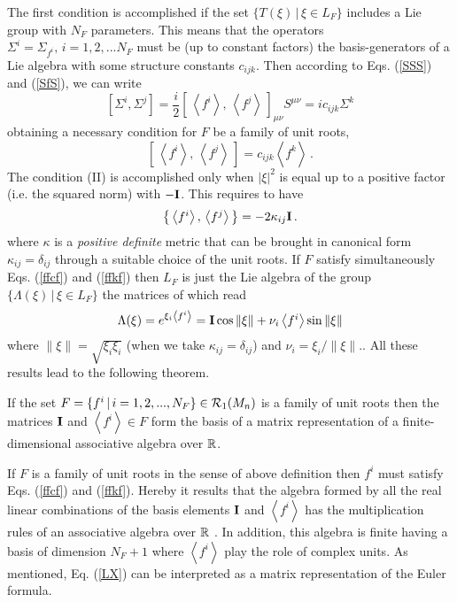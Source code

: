 \documentclass[a4paper,12pt]{article}
\begin{document}
The first condition is accomplished if the set $\{ T(\xi)\,|\, \xi \in L_F\}$ 
includes a Lie group with $N_F$ parameters. This means that the  operators 
$\Sigma^i=\Sigma_{f^i},\, i=1,2,...N_F $ must be (up to constant factors) the 
basis-generators of a Lie algebra with some structure constants $c_{ijk}$. 
Then according to Eqs. (\ref{SSS}) and (\ref{SfS}), we can write
\begin{equation}\label{SSffS}
\left[\Sigma^i, \Sigma^j\right]=
\textstyle{\frac{i}{2} \left[\,\left<f^i\right>,\,\left<f^j\right>\,
\right]_{\mu\nu}} S^{\mu\nu}= ic_{ijk}\Sigma^k 
\end{equation}
obtaining a necessary condition for $F$ be a family of unit roots,
\begin{equation}\label{ffcf}
{\textstyle [\,\left<f^i\right>,\,\left<f^j\right>\, ]}=c_{ijk}
{\textstyle \left< \right.} f^k {\textstyle \left. \right>}\,.
\end{equation} 
The condition (II) is accomplished only when $|\xi|^2$ is equal up to a 
positive factor (i.e. the squared norm) with $-{\bf I}$. This requires to have
\begin{equation}\label{ffkf}
 \left\{\,\textstyle{\left<f^i\right>,\,\left<f^j\right>}\,\right\}
=-2\kappa_{ij} {\bf I}\,.
\end{equation} 
where $\kappa$ is a {\em positive definite} metric that can be brought in 
canonical 
form $\kappa_{ij}=\delta_{ij}$ through a suitable choice of the 
unit roots.  
If $F$ satisfy simultaneously Eqs. (\ref{ffcf}) and (\ref{ffkf}) then $L_F$ is 
just the Lie algebra of the group $\{\Lambda(\xi)\,|\, \xi\in L_F\}$ the 
matrices of which read
\begin{equation}\label{LX}  
\Lambda(\xi)=\textstyle{e^{\xi_i \left<f^i\right>}={\bf I}\cos\|\xi\|+
\nu_i \left<f^i\right>}\sin\|\xi\|
\end{equation} 
where $\|\xi\|=\sqrt{\xi_i\xi_i}$ (when we take $\kappa_{ij}=\delta_{ij}$) and 
$\nu_i =\xi_i/\|\xi\|$.. All these results lead to the following theorem.
\begin{theor}
If the set $F=\{f^i\,|\,i=1,2,...,N_F\} \in {\cal R}_1(M_n)$ is a family of 
unit roots then the matrices ${\bf I}$ and $\left<f^i\right>\in F$ form the 
basis of a matrix representation of a finite-dimensional associative algebra 
over ${\Bbb R}$.      
\end{theor}
\begin{demo}
If $F$ is a family of unit roots in the sense of above definition then 
$f^i$ must satisfy Eqs. (\ref{ffcf}) and (\ref{ffkf}). Hereby it results that 
the algebra formed by all the real linear combinations of the basis elements 
${\bf I}$ and $\left<f^i\right>$ has the multiplication rules of an associative 
algebra over ${\Bbb R}$ \cite{KANT}. In addition, this algebra is finite having 
a basis of dimension $N_F+1$ where $\left<f^i\right>$ play the role of complex 
units. As mentioned, Eq. (\ref{LX}) can be interpreted as a matrix 
representation of the Euler formula.
\end{demo}\\
\end{document}
